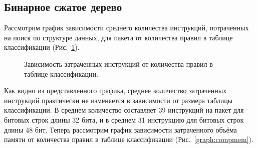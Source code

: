 \documentclass[a4paper, 12pt, titlepage, finall]{extreport}
\begin{document}
        \subsection{Бинарное сжатое дерево}
            Рассмотрим график зависимости среднего количества инструкций, потраченных на поиск по структуре данных, для пакета от количества правил в таблице классификации (Рис.~\ref{graph:compinst}).
            \begin{figure}[h!]
                \centering
                \captionsetup{justification=centering}
                \caption{Зависимость затраченных инструкций от количества правил в таблице классификации.}
                \label{graph:compinst}
            \end{figure}
            Как видно из представленного графика, среднее количество затраченных инструкций практически не изменяется в зависимости от размера таблицы классификации. 
            В среднем количество составляет 39 инструкций на пакет для битовых строк длины 32 бита, и в среднем 31 инструкцию для битовых строк длины 48 бит.
            Теперь рассмотрим график зависимости затраченного объёма памяти от количества правил в таблице классификации (Рис.~\ref{graph:compmem}).
\end{document}
